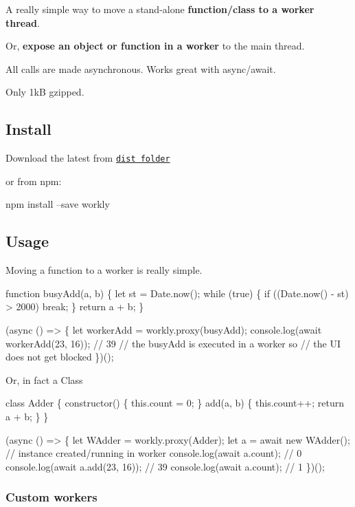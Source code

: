 
\begin{DoxyItemize}
\item A really simple way to move a stand-\/alone {\bfseries function/class to a worker thread}.
\item Or, {\bfseries expose an object or function in a worker} to the main thread.
\item All calls are made asynchronous. Works great with async/await.
\item Only 1kB gzipped.
\end{DoxyItemize}

\subsection*{Install}

Download the latest from \href{https://github.com/pshihn/workly/tree/master/dist}{\tt dist folder}

or from npm\+: 
\begin{DoxyCode}
npm install --save workly
\end{DoxyCode}


\subsection*{Usage}

Moving a function to a worker is really simple. 
\begin{DoxyCode}
function busyAdd(a, b) \{
  let st = Date.now();
  while (true) \{
    if ((Date.now() - st) > 2000) break;
  \}
  return a + b;
\}

(async () => \{
  let workerAdd = workly.proxy(busyAdd);
  console.log(await workerAdd(23, 16)); // 39
  // the busyAdd is executed in a worker so
  // the UI does not get blocked
\})();
\end{DoxyCode}


Or, in fact a Class


\begin{DoxyCode}
class Adder \{
  constructor() \{
    this.count = 0;
  \}
  add(a, b) \{
    this.count++;
    return a + b;
  \}
\}

(async () => \{
  let WAdder = workly.proxy(Adder);
  let a = await new WAdder(); // instance created/running in worker
  console.log(await a.count); // 0
  console.log(await a.add(23, 16)); // 39
  console.log(await a.count); // 1
\})();
\end{DoxyCode}


\subsubsection*{Custom workers}

